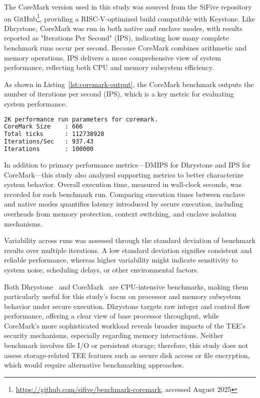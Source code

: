 The CoreMark version used in this study was sourced from the SiFive repository on GitHub\footnote{\url{https://github.com/sifive/benchmark-coremark}, accessed August 2025}, providing a RISC-V-optimized build compatible with Keystone. Like Dhrystone, CoreMark was run in both native and enclave modes, with results reported as "Iterations Per Second" (IPS), indicating how many complete benchmark runs occur per second. Because CoreMark combines arithmetic and memory operations, IPS delivers a more comprehensive view of system performance, reflecting both CPU and memory subsystem efficiency.

As shown in Listing~\ref{lst:coremark-output}, the CoreMark benchmark outputs the number of iterations per second (IPS), which is a key metric for evaluating system performance.
\begin{lstlisting}[language=bash, caption={CoreMark sample output used to extract IPS}, label={lst:coremark-output}]
2K performance run parameters for coremark.
CoreMark Size    : 666
Total ticks      : 112738928
Iterations/Sec   : 937.43
Iterations       : 100000
\end{lstlisting}

In addition to primary performance metrics—DMIPS for Dhrystone and IPS for CoreMark—this study also analyzed supporting metrics to better characterize system behavior. Overall execution time, measured in wall-clock seconds, was recorded for each benchmark run. Comparing execution times between enclave and native modes quantifies latency introduced by secure execution, including overheads from memory protection, context switching, and enclave isolation mechanisms.

Variability across runs was assessed through the standard deviation of benchmark results over multiple iterations. A low standard deviation signifies consistent and reliable performance, whereas higher variability might indicate sensitivity to system noise, scheduling delays, or other environmental factors.

Both Dhrystone~\cite{weiss2002dhrystone} and CoreMark~\cite{gal2012exploring} are CPU-intensive benchmarks, making them particularly useful for this study’s focus on processor and memory subsystem behavior under secure execution. Dhrystone targets raw integer and control flow performance, offering a clear view of base processor throughput, while CoreMark’s more sophisticated workload reveals broader impacts of the TEE’s security mechanisms, especially regarding memory interactions. Neither benchmark involves file I/O or persistent storage; therefore, this study does not assess storage-related TEE features such as secure disk access or file encryption, which would require alternative benchmarking approaches.

